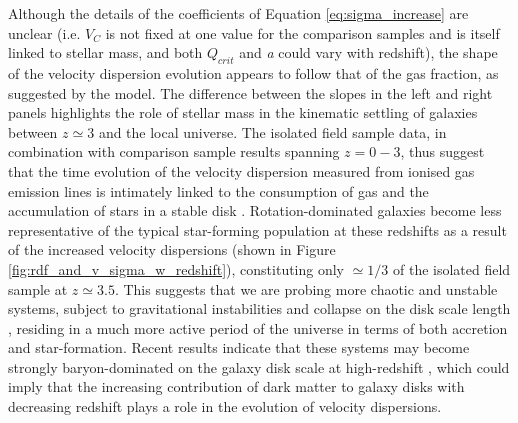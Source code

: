\documentclass[fleqn,usenatbib]{mnras}
\begin{document}
Although the details of the coefficients of Equation \ref{eq:sigma_increase} are unclear (i.e. $V_{C}$ is not fixed at one value for the comparison samples and is itself linked to stellar mass, and both $Q_{crit}$ and {\it a} could vary with redshift), the shape of the velocity dispersion evolution appears to follow that of the gas fraction, as suggested by the model.
The difference between the slopes in the left and right panels highlights the role of stellar mass in the kinematic settling of galaxies between $z\simeq3$ and the local universe. 
The isolated field sample data, in combination with comparison sample results spanning $z=0-3$, thus suggest that the time evolution of the velocity dispersion measured from ionised gas emission lines is intimately linked to the consumption of gas and the accumulation of stars in a stable disk \citep[e.g.][]{Law2009,Law2012b,Law2012c,Wisnioski2015}.
Rotation-dominated galaxies become less representative of the typical star-forming population at these redshifts as a result of the increased velocity dispersions (shown in Figure \ref{fig:rdf_and_v_sigma_w_redshift}), constituting only $\simeq1/3$ of the isolated field sample at $z\simeq3.5$.
This suggests that we are probing more chaotic and unstable systems, subject to gravitational instabilities and collapse on the disk scale length \citep{Burkert2010,Genzel2011}, residing in a much more active period of the universe in terms of both accretion and star-formation.
Recent results indicate that these systems may become strongly baryon-dominated on the galaxy disk scale at high-redshift \citep{Ubler2017,Lang2017,Genzel2017}, which could imply that the increasing contribution of dark matter to galaxy disks with decreasing redshift plays a role in the evolution of velocity dispersions.   
\end{document}
